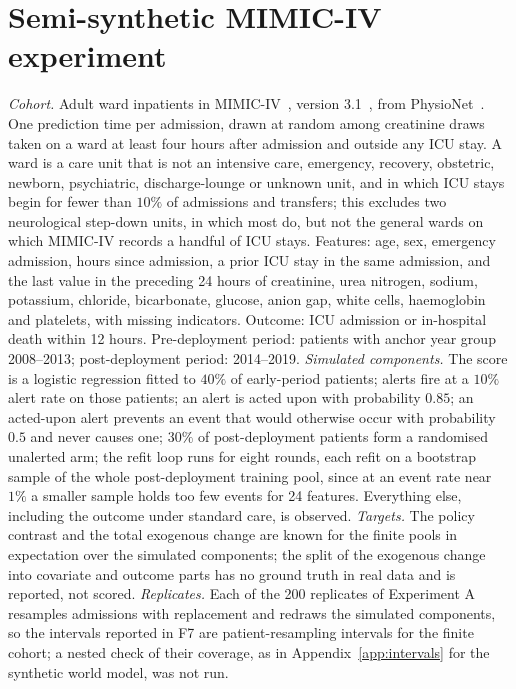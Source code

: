 \documentclass[letterpaper]{article} %
\begin{document}


\section{Semi-synthetic MIMIC-IV experiment}
\label{app:mimic}
\emph{Cohort.} Adult ward inpatients in MIMIC-IV~\citep{johnson2023mimic},
version 3.1~\citep{johnson2024mimiciv}, from
PhysioNet~\citep{goldberger2000physionet}.
One prediction time per admission, drawn at random among creatinine draws
taken on a ward at least four hours after admission and outside any ICU
stay. A ward is a care unit that is not an intensive care, emergency,
recovery, obstetric, newborn, psychiatric, discharge-lounge or unknown unit,
and in which ICU stays begin for fewer than $10\%$ of admissions and
transfers; this excludes two neurological step-down units, in which most do,
but not the general wards on which MIMIC-IV records a handful of ICU stays. Features: age, sex, emergency admission, hours since admission, a
prior ICU stay in the same admission, and the last value in the preceding
24 hours of creatinine, urea nitrogen, sodium, potassium, chloride,
bicarbonate, glucose, anion gap, white cells, haemoglobin and platelets, with
missing indicators. Outcome: ICU admission or in-hospital death within
12 hours. Pre-deployment period: patients with anchor year group 2008--2013;
post-deployment period: 2014--2019.
\emph{Simulated components.} The score is a logistic regression fitted to
$40\%$ of early-period patients; alerts fire at a $10\%$ alert rate on those
patients; an alert is acted upon with probability $0.85$; an acted-upon alert
prevents an event that would otherwise occur with probability $0.5$ and never
causes one; $30\%$ of post-deployment patients form a randomised unalerted
arm; the refit loop runs for eight rounds, each refit on a bootstrap sample
of the whole post-deployment training pool, since at an event rate near
$1\%$ a smaller sample holds too few events for 24 features.
Everything else, including the outcome under standard care, is observed.
\emph{Targets.} The policy contrast and the total exogenous change are known
for the finite pools in expectation over the simulated components; the split
of the exogenous change into covariate and outcome parts has no ground truth
in real data and is reported, not scored.
\emph{Replicates.} Each of the 200 replicates of Experiment A resamples
admissions with replacement and redraws the simulated components, so the
intervals reported in F7 are patient-resampling intervals for the finite
cohort; a nested check of their coverage, as in Appendix~\ref{app:intervals}
for the synthetic world model, was not run.
\end{document}
